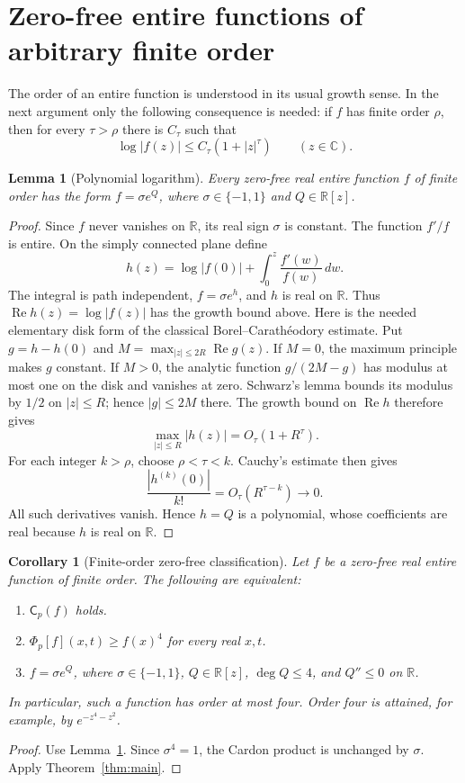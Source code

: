 \documentclass[11pt,a4paper]{article}
\newtheorem{lemma}[theorem]{Lemma}
\newtheorem{corollary}[theorem]{Corollary}
\theoremstyle{remark}\newtheorem{remark}[theorem]{Remark}
\newcommand{\R}{\mathbb R}\newcommand{\C}{\mathbb C}
\newcommand{\Ph}{\Phi_p}
\DeclareMathOperator{\Repart}{Re}
\begin{document}
\section{Zero-free entire functions of arbitrary finite order}

The order of an entire function is understood in its usual growth
sense. In the next argument only the following consequence is needed:
if $f$ has finite order $\rho$, then for every $\tau>\rho$ there is
$C_\tau$ such that
\[
 \log|f(z)|\le C_\tau(1+|z|^\tau)\qquad(z\in\C).
\]

\begin{lemma}[Polynomial logarithm]\label{lem:log}
Every zero-free real entire function $f$ of finite order has the form
$f=\sigma e^Q$, where $\sigma\in\{-1,1\}$ and $Q\in\R[z]$.
\end{lemma}
\begin{proof}
Since $f$ never vanishes on $\R$, its real sign $\sigma$ is constant.
The function $f'/f$ is entire. On the simply connected plane define
\[
 h(z)=\log|f(0)|+\int_0^z\frac{f'(w)}{f(w)}\,dw.
\]
The integral is path independent, $f=\sigma e^h$, and $h$ is real on
$\R$. Thus $\Repart h(z)=\log|f(z)|$ has the growth bound above.
Here is the needed elementary disk form of the classical
Borel--Carath\'eodory estimate. Put $g=h-h(0)$ and
$M=\max_{|z|\le2R}\Repart g(z)$. If $M=0$, the maximum principle
makes $g$ constant. If $M>0$, the analytic function
$g/(2M-g)$ has modulus at most one on the disk and vanishes at zero.
Schwarz's lemma bounds its modulus by $1/2$ on $|z|\le R$; hence
$|g|\le2M$ there. The growth bound on $\Repart h$ therefore gives
\[
 \max_{|z|\le R}|h(z)|=O_\tau(1+R^\tau).
\]
For each integer $k>\rho$, choose $\rho<\tau<k$. Cauchy's estimate
then gives
\[
 \frac{|h^{(k)}(0)|}{k!}=O_\tau(R^{\tau-k})\longrightarrow0.
\]
All such derivatives vanish. Hence $h=Q$ is a polynomial, whose
coefficients are real because $h$ is real on $\R$.
\end{proof}

\begin{corollary}[Finite-order zero-free classification]\label{cor:entire}
Let $f$ be a zero-free real entire function of finite order. The following
are equivalent:
\begin{enumerate}[label=\textup{(\roman*)},itemsep=3pt]
\item $\mathsf C_p(f)$ holds.
\item $\Ph[f](x,t)\ge f(x)^4$ for every real $x,t$.
\item $f=\sigma e^Q$, where $\sigma\in\{-1,1\}$, $Q\in\R[z]$,
$\deg Q\le4$, and $Q''\le0$ on $\R$.
\end{enumerate}
In particular, such a function has order at most four. Order four is
attained, for example, by $e^{-z^4-z^2}$.
\end{corollary}
\begin{proof}
Use Lemma~\ref{lem:log}. Since $\sigma^4=1$, the Cardon product is
unchanged by $\sigma$. Apply Theorem~\ref{thm:main}.
\end{proof}
\end{document}
